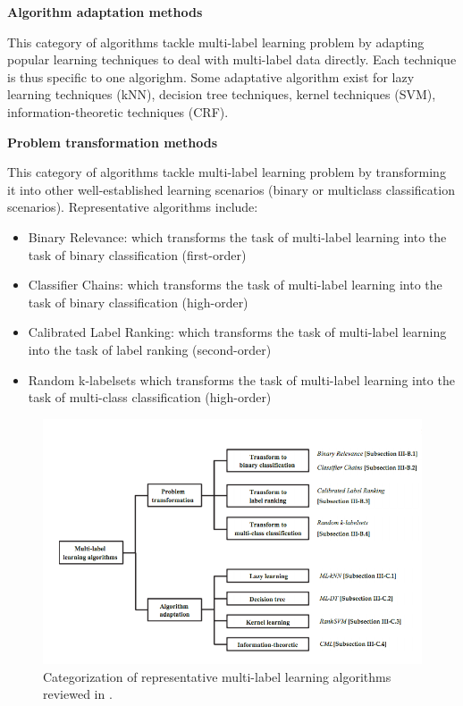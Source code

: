 \textbf{Algorithm adaptation methods}

This category of algorithms tackle multi-label learning problem by adapting popular learning techniques to deal with multi-label data directly. Each technique is thus specific to one algorighm.
Some adaptative algorithm exist for lazy learning techniques (kNN), decision tree techniques, kernel techniques (SVM), information-theoretic techniques (CRF).

\textbf{Problem transformation methods}

This category of algorithms tackle multi-label learning problem by transforming it into other well-established learning scenarios (binary or multiclass classification scenarios). 
Representative algorithms include:
\begin{itemize}
 \item Binary Relevance: which transforms the task of multi-label learning into the task of binary classification (first-order)
 \item Classifier Chains: which transforms the task of multi-label learning into the task of binary classification (high-order)
 \item Calibrated Label Ranking: which transforms the task of multi-label learning into the task of label ranking (second-order)
 \item Random k-labelsets which transforms the task of multi-label learning into the task of multi-class classification (high-order)
\end{itemize}

\begin{figure}[H]
\centering
\includegraphics[scale=0.6]{./images/machine-learning/multi-label-approaches.png}
\caption{Categorization of representative multi-label learning algorithms reviewed in \cite{MultilabelReview}.}
\label{fig:multilabelOverview}
\end{figure}




